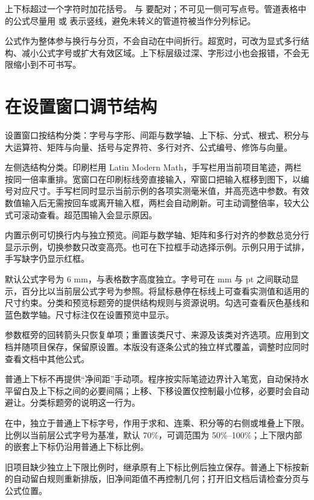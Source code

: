 上下标超过一个字符时加花括号。\code{\left} 与 \code{\right} 要配对；不可见一侧可写点号。管道表格中的公式尽量用 \code{\vert} 或 \code{\Vert} 表示竖线，避免未转义的管道符被当作分列标记。

公式作为整体参与换行与分页，不会自动在中间折行。超宽时，可改为显式多行结构、减小公式字号或扩大有效区域。上下标层级过深、字形过小也会报错，不会无限缩小到不可书写。

\section{在设置窗口调节结构}
设置窗口按结构分类：字号与字形、间距与数学轴、上下标、分式、根式、积分与大运算符、矩阵与向量、括号与定界符、多行对齐、公式编号、修饰与向量。

左侧选结构分类。印刷栏用 Latin Modern Math，手写栏用当前项目笔迹，两栏按同一倍率重排。宽窗口在印刷标线旁直接输入，窄窗口把输入框移到图下，以编号对应尺寸。手写栏同时显示当前示例的各项实测毫米值，并高亮选中参数。有效数值输入后无需按回车或离开输入框，两栏会自动刷新。可主动调整倍率，较大公式可滚动查看。超范围输入会显示原因。

内置示例可切换行内与独立预览。间距与数学轴、矩阵和多行对齐的参数总览分行显示示例，切换参数只改变高亮。也可在下拉框手动选择示例。示例只用于试排，手写缺字仍显示红框。

默认公式字号为 6 mm，与表格数字高度独立。字号可在 mm 与 pt 之间联动显示，百分比以当前层公式字号为参照。将鼠标悬停在标线上可查看实测值和适用的尺寸约束。分类和预览标题旁的提供结构规则与资源说明。勾选可查看灰色基线和蓝色数学轴。尺寸标注仅在设置预览中显示。

参数框旁的回转箭头只恢复单项；重置该类尺寸、来源及该类对齐选项。应用到文档并随项目保存，保留原设置。本版没有逐条公式的独立样式覆盖，调整时应同时查看文档中其他公式。

普通上下标不再提供“净间距”手动项。程序按实际笔迹边界计入笔宽，自动保持水平留白及上下标之间的必要间隔；上移、下移设置仅控制最小位移，必要时会自动避让。分类标题旁的说明这一行为。

在中，独立于普通上下标字号，作用于求和、连乘、积分等的右侧或堆叠上下限。比例以当前层公式字号为基准，默认 70\%，可调范围为 50\%--100\%；上下限内部的嵌套上下标仍沿用普通上下标比例。

旧项目缺少独立上下限比例时，继承原有上下标比例后独立保存。普通上下标按新的自动留白规则重新排版，旧净间距值不再控制几何；打开旧文档后请检查分页与公式位置。

